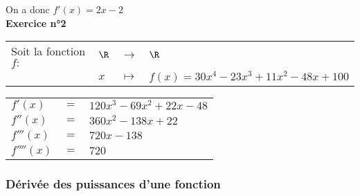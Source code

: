\vspace*{.3cm}

On a donc $f'(x) = 2x - 2$ \\

\textbf{Exercice n°2} \\

\begin{tabular}{llll}
Soit la fonction $f :$ & $\R$ & $\longrightarrow$ & $\R$ \\
& $x$ & $\longmapsto$ & $f(x) = 30x^4 - 23x^3 + 11x^2 -48x +100$ \\
\end{tabular}

\vspace*{.3cm}

\begin{tabular}{lll}
$f'(x)$ & $=$ & $ 120x^3 - 69x^2 + 22x - 48 $ \\
$f''(x)$ & $=$ & $ 360x^2 - 138x + 22 $ \\
$f'''(x)$ & $=$ & $ 720 x - 138$ \\
$f''''(x)$ & $=$ & $ 720$ \\
\end{tabular}

\newpage

\subsubsection{Dérivée des puissances d'une fonction}

